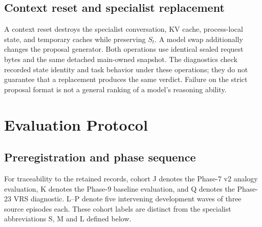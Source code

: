 \documentclass[11pt]{article}
\begin{document}
\subsection{Context reset and specialist replacement}

A context reset destroys the specialist conversation, KV cache, process-local state, and temporary caches while preserving $S_t$. A model swap additionally changes the proposal generator. Both operations use identical sealed request bytes and the same detached main-owned snapshot. The diagnostics check recorded state identity and task behavior under these operations; they do not guarantee that a replacement produces the same verdict. Failure on the strict proposal format is not a general ranking of a model's reasoning ability.

\section{Evaluation Protocol}
\label{sec:protocol}

\subsection{Preregistration and phase sequence}

For traceability to the retained records, cohort J denotes the Phase-7 v2 analogy evaluation, K denotes the Phase-9 baseline evaluation, and Q denotes the Phase-23 VRS diagnostic. L--P denote five intervening development waves of three source episodes each. These cohort labels are distinct from the specialist abbreviations S, M and L defined below.
\end{document}
